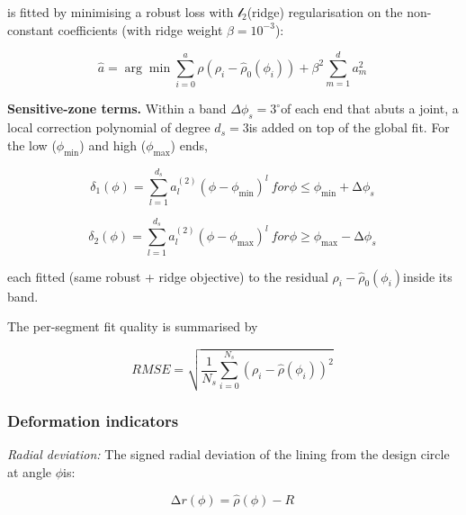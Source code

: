 \documentclass[preprint,12pt,authoryear]{elsarticle}
\begin{document}
is fitted by minimising a robust loss with \(\mathcal{l}_{2}\)(ridge)
regularisation on the non-constant coefficients (with ridge weight
\(\beta = 10^{- 3}\)):

\begin{equation}
  \widehat{a} = \arg{\min{\sum_{i = 0}^{a}\rho}}\left( \rho_{i} - {\widehat{\rho}}_{0}\left( \phi_{i} \right) \right) + \beta^{2}\sum_{m = 1}^{d}a_{m}^{2}\
  \label{eq:14}
\end{equation}


\textbf{Sensitive-zone terms.} Within a band
\(\Delta\phi_{s} = 3^{\circ}\)of each end that abuts a joint, a local
correction polynomial of degree \(d_{s} = 3\)is added on top of the
global fit. For the low (\(\phi_{\min}\)) and high (\(\phi_{\max}\))
ends,

\begin{equation}
  \delta_{1}(\phi) = \sum_{l = 1}^{d_{s}}{a_{l}^{(2)}\left( \phi - \phi_{\min} \right)^{l}}\
  for
  \phi \leq \phi_{\min} + \mathrm{\Delta}\phi_{s}\
  \label{eq:15}
\end{equation}


\begin{equation}
  \delta_{2}(\phi) = \sum_{l = 1}^{d_{s}}{a_{l}^{(2)}\left( \phi - \phi_{\max} \right)^{l}}\ for
  \phi \geq \phi_{\max} - \mathrm{\Delta}\phi_{s}\
  \label{eq:16}
\end{equation}



each fitted (same robust + ridge objective) to the residual
\(\rho_{i} - {\widehat{\rho}}_{0}(\phi_{i})\)inside its band.

The per-segment fit quality is summarised by

\begin{equation}
  RMSE = \sqrt{\frac{1}{N_{s}}\sum_{i = 0}^{N_{s}}\left( \rho_{i} - \widehat{\rho}\left( \phi_{i} \right) \right)^{2}}\
  \label{eq:17}
\end{equation}


\subsubsection{Deformation indicators}\label{deformation-indicators}

\emph{Radial deviation:} The signed radial deviation of the lining from
the design circle at angle \(\phi\)is:

\begin{equation}
  \mathrm{\Delta}r(\phi) = \widehat{\rho}(\phi) - R\
  \label{eq:18}
\end{equation}
\end{document}

